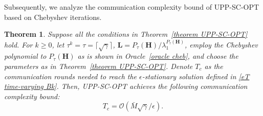 \documentclass[12pt,draftcls,onecolumn]{IEEEtran}
\newtheorem{theorem}{Theorem}
\begin{document}




Subsequently, we analyze the communication complexity bound of UPP-SC-OPT based on Chebyshev iterations.

\begin{theorem}\label{theorem optimal communication complexity bound}
	Suppose all the conditions in Theorem~\ref{theorem UPP-SC-OPT} hold. For $k\geq 0$, let $\tau^k=\tau=\lceil {\sqrt{\gamma}} \rceil$, $\mathbf{L}=P_{\tau}(\mathbf{H})/\lambda_1^{P_{\tau}(\mathbf{H})}$, employ the Chebyshev polynomial to $P_{\tau}(\mathbf{H})$ as is shown in Oracle~\ref{oracle cheb}, and choose the parameters as in Theorem~\ref{theorem UPP-SC-OPT}. Denote $T_c$ as the communication rounds needed to reach the $\epsilon$-stationary solution defined in \eqref{eT time-varying Bk}. Then, UPP-SC-OPT achieves the following communication complexity bound:
	\vspace{-0.2cm}
	\begin{equation}
		\label{Tc leq} T_c =\mathcal{O}({\bar{M}\sqrt{\gamma}}/{\epsilon}).
	\end{equation}
\end{theorem}
\end{document}
